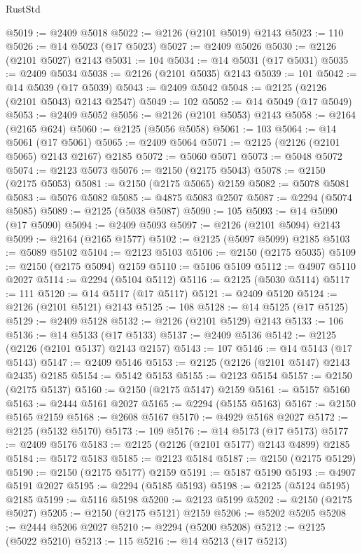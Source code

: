 \begin{lexlean}{RustStd}
\begin{coremodule}
@5019 := @2409 @5018
@5022 := @2126 (@2101 @5019) @2143
@5023 := 110
@5026 := @14 @5023 (@17 @5023)
@5027 := @2409 @5026
@5030 := @2126 (@2101 @5027) @2143
@5031 := 104
@5034 := @14 @5031 (@17 @5031)
@5035 := @2409 @5034
@5038 := @2126 (@2101 @5035) @2143
@5039 := 101
@5042 := @14 @5039 (@17 @5039)
@5043 := @2409 @5042
@5048 := @2125 (@2126 (@2101 @5043) @2143 @2547)
@5049 := 102
@5052 := @14 @5049 (@17 @5049)
@5053 := @2409 @5052
@5056 := @2126 (@2101 @5053) @2143
@5058 := @2164 (@2165 @624)
@5060 := @2125 (@5056 @5058)
@5061 := 103
@5064 := @14 @5061 (@17 @5061)
@5065 := @2409 @5064
@5071 := @2125 (@2126 (@2101 @5065) @2143 @2167) @2185
@5072 := @5060 @5071
@5073 := @5048 @5072
@5074 := @2123 @5073
@5076 := @2150 (@2175 @5043)
@5078 := @2150 (@2175 @5053)
@5081 := @2150 (@2175 @5065) @2159
@5082 := @5078 @5081
@5083 := @5076 @5082
@5085 := @4875 @5083 @2507
@5087 := @2294 (@5074 @5085)
@5089 := @2125 (@5038 @5087)
@5090 := 105
@5093 := @14 @5090 (@17 @5090)
@5094 := @2409 @5093
@5097 := @2126 (@2101 @5094) @2143
@5099 := @2164 (@2165 @1577)
@5102 := @2125 (@5097 @5099) @2185
@5103 := @5089 @5102
@5104 := @2123 @5103
@5106 := @2150 (@2175 @5035)
@5109 := @2150 (@2175 @5094) @2159
@5110 := @5106 @5109
@5112 := @4907 @5110 @2027
@5114 := @2294 (@5104 @5112)
@5116 := @2125 (@5030 @5114)
@5117 := 111
@5120 := @14 @5117 (@17 @5117)
@5121 := @2409 @5120
@5124 := @2126 (@2101 @5121) @2143
@5125 := 108
@5128 := @14 @5125 (@17 @5125)
@5129 := @2409 @5128
@5132 := @2126 (@2101 @5129) @2143
@5133 := 106
@5136 := @14 @5133 (@17 @5133)
@5137 := @2409 @5136
@5142 := @2125 (@2126 (@2101 @5137) @2143 @2157)
@5143 := 107
@5146 := @14 @5143 (@17 @5143)
@5147 := @2409 @5146
@5153 := @2125 (@2126 (@2101 @5147) @2143 @2435) @2185
@5154 := @5142 @5153
@5155 := @2123 @5154
@5157 := @2150 (@2175 @5137)
@5160 := @2150 (@2175 @5147) @2159
@5161 := @5157 @5160
@5163 := @2444 @5161 @2027
@5165 := @2294 (@5155 @5163)
@5167 := @2150 @5165 @2159
@5168 := @2608 @5167
@5170 := @4929 @5168 @2027
@5172 := @2125 (@5132 @5170)
@5173 := 109
@5176 := @14 @5173 (@17 @5173)
@5177 := @2409 @5176
@5183 := @2125 (@2126 (@2101 @5177) @2143 @4899) @2185
@5184 := @5172 @5183
@5185 := @2123 @5184
@5187 := @2150 (@2175 @5129)
@5190 := @2150 (@2175 @5177) @2159
@5191 := @5187 @5190
@5193 := @4907 @5191 @2027
@5195 := @2294 (@5185 @5193)
@5198 := @2125 (@5124 @5195) @2185
@5199 := @5116 @5198
@5200 := @2123 @5199
@5202 := @2150 (@2175 @5027)
@5205 := @2150 (@2175 @5121) @2159
@5206 := @5202 @5205
@5208 := @2444 @5206 @2027
@5210 := @2294 (@5200 @5208)
@5212 := @2125 (@5022 @5210)
@5213 := 115
@5216 := @14 @5213 (@17 @5213)

\end{coremodule}
\end{lexlean}
